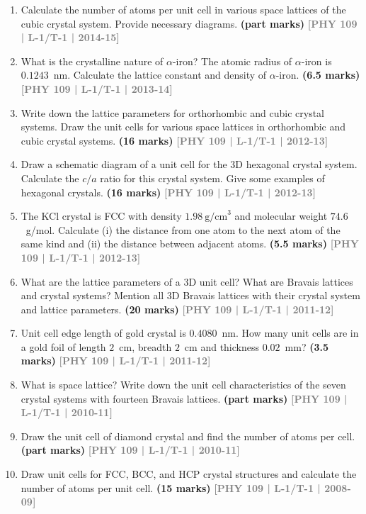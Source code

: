 \documentclass[12pt,a3paper]{article}
\newcommand{\yr}[1]{\hfill\textcolor{gray}{\small\textbf{[#1]}}}
\newcommand{\mk}[1]{\textcolor{orange!70!black}{\small\textbf{(#1 marks)}}}
\begin{document}
\begin{enumerate}
\item Calculate the number of atoms per unit cell in various space lattices of the cubic crystal system. Provide necessary diagrams.
\mk{part} \yr{PHY 109 | L-1/T-1 | 2014-15}

\item What is the crystalline nature of $\alpha$-iron? The atomic radius of $\alpha$-iron is $0.1243$~nm. Calculate the lattice constant and density of $\alpha$-iron.
\mk{6.5} \yr{PHY 109 | L-1/T-1 | 2013-14}

\item Write down the lattice parameters for orthorhombic and cubic crystal systems. Draw the unit cells for various space lattices in orthorhombic and cubic crystal systems.
\mk{16} \yr{PHY 109 | L-1/T-1 | 2012-13}

\item Draw a schematic diagram of a unit cell for the 3D hexagonal crystal system. Calculate the $c/a$ ratio for this crystal system. Give some examples of hexagonal crystals.
\mk{16} \yr{PHY 109 | L-1/T-1 | 2012-13}

\item The KCl crystal is FCC with density $1.98\ \text{g/cm}^3$ and molecular weight $74.6$~g/mol. Calculate (i) the distance from one atom to the next atom of the same kind and (ii) the distance between adjacent atoms.
\mk{5.5} \yr{PHY 109 | L-1/T-1 | 2012-13}

\item What are the lattice parameters of a 3D unit cell? What are Bravais lattices and crystal systems? Mention all 3D Bravais lattices with their crystal system and lattice parameters.
\mk{20} \yr{PHY 109 | L-1/T-1 | 2011-12}

\item Unit cell edge length of gold crystal is $0.4080$~nm. How many unit cells are in a gold foil of length $2$~cm, breadth $2$~cm and thickness $0.02$~mm?
\mk{3.5} \yr{PHY 109 | L-1/T-1 | 2011-12}

\item What is space lattice? Write down the unit cell characteristics of the seven crystal systems with fourteen Bravais lattices.
\mk{part} \yr{PHY 109 | L-1/T-1 | 2010-11}

\item Draw the unit cell of diamond crystal and find the number of atoms per cell.
\mk{part} \yr{PHY 109 | L-1/T-1 | 2010-11}

\item Draw unit cells for FCC, BCC, and HCP crystal structures and calculate the number of atoms per unit cell.
\mk{15} \yr{PHY 109 | L-1/T-1 | 2008-09}


\end{enumerate}
\end{document}
